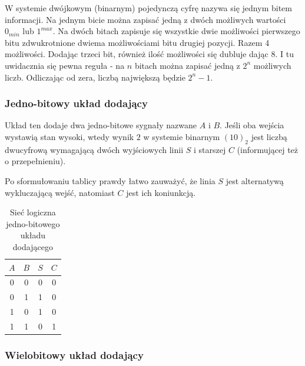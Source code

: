 \documentclass[a4paper,12pt]{article}
\begin{document}
W systemie dwójkowym (binarnym) pojedynczą cyfrę nazywa się jednym bitem informacji. Na jednym bicie można zapisać jedną z dwóch możliwych wartości $0_{min}$ lub $1^{max}$. Na dwóch bitach zapisuje się wszystkie dwie możliwości pierwszego bitu zdwukrotnione dwiema możliwościami bitu drugiej pozycji. Razem 4 możliwości. Dodając trzeci bit, również ilość możliwości się dubluje dając 8. I tu uwidacznia się pewna reguła - na $n$ bitach można zapisać jedną z $2^n$ możliwych liczb. Odliczając od zera, liczbą największą będzie $2^n-1$.

\subsubsection{Jedno-bitowy układ dodający}

Układ ten dodaje dwa jedno-bitowe sygnały nazwane $A$ i $B$. Jeśli oba wejścia wystawią stan wysoki, wtedy wynik $2$ w systemie binarnym $(10)_2$ jest liczbą dwucyfrową wymagającą dwóch wyjściowych linii $S$ i starszej $C$ (informującej też o przepełnieniu).

Po sformułowaniu tablicy prawdy łatwo zauważyć, że linia $S$ jest alternatywą wykluczającą wejść, natomiast $C$ jest ich koniunkcją.

\begin{table}[h!]
\centering

\begin{minipage}{5.5cm}
\centering

\begin{tabular}{ | c | c || c | c | }
  \hline
  $A$ & $B$ & $S$ & $C$ \\ \hline
  0 & 0 & 0 & 0 \\
  0 & 1 & 1 & 0 \\
  1 & 0 & 1 & 0 \\
  1 & 1 & 0 & 1 \\
  \hline
\end{tabular}
\end{minipage}
\begin{minipage}{11cm}
   \centering
   
   \caption*{Sieć logiczna jedno-bitowego układu dodającego}
\end{minipage}
\end{table}


\subsubsection{Wielobitowy układ dodający}
\end{document}

